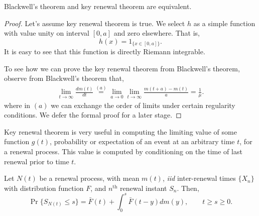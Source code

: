 \documentclass[a4paper,10pt,english]{article}
\begin{document}
\begin{prop}[Equivalence] Blackwell's theorem and key renewal theorem are equivalent.
\end{prop}
\begin{proof} Let's assume key renewal theorem is true. We select $h$ as a simple function with value unity on interval $[0, a]$ and zero elsewhere. That is,
\begin{equation*}
h(x) = 1_{\{ x \in [0,a]\}}.
\end{equation*}
It is easy to see that this function is directly Riemann integrable. %



To see how we can prove the key renewal theorem from Blackwell's theorem, observe from Blackwell's theorem that,
\begin{align*}
\lim_{t \to \infty}\frac{dm(t)}{dt} \stackrel{(a)}= \lim_{a \to 0}\lim_{t \to \infty} \frac{m(t
+a)-m(t)}{a}=\frac{1}{\mu}.
\end{align*}     
where in $(a)$ we can exchange the order of limits under certain regularity conditions. 
We defer the formal proof for a later stage.
\end{proof}
\begin{rem} Key renewal theorem is very useful in computing the limiting value of some function $g(t)$, probability or expectation of an event at an arbitrary time $t$, for a renewal process. This value is computed by conditioning on the time of last renewal prior to time $t$.
\end{rem}
\begin{thm} Let $N(t)$ be a renewal process, with mean $m(t)$, \emph{iid} inter-renewal times $\{X_n\}$ with distribution function $F$, and $n^{\mathrm{th}}$ renewal instant $S_n$. Then,
\begin{equation*}
\Pr\{S_{N(t)}\leq s\}=\bar{F}(t)+\int_{0}^{s}\bar{F}(t-y)dm(y),\quad\quad t\geq s \geq 0.
\end{equation*}
\end{thm} 
\end{document}
